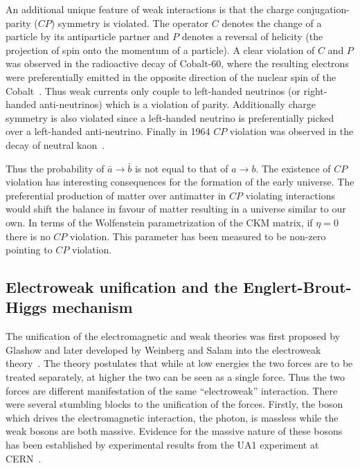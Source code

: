 An additional unique feature of weak interactions is that the charge conjugation-parity ($CP$) symmetry is violated. The operator $C$ denotes the change of a particle by its antiparticle partner and $P$ denotes a reversal of helicity (the projection of spin onto the momentum of a particle). A clear violation of $C$ and $P$ was observed in the radioactive decay of Cobalt-60, where the resulting electrons were preferentially emitted in the opposite direction of the nuclear spin of the Cobalt~\cite{Experimentalb}. Thus weak currents only couple to left-handed neutrinos (or right-handed anti-neutrinos) which is a violation of parity. Additionally charge symmetry is also violated since a left-handed neutrino is preferentially picked over a left-handed anti-neutrino. Finally in 1964 $CP$ violation was observed in the decay of neutral kaon~\cite{Evidence}.

Thus the probability of $\bar{a}\rightarrow \bar{b}$ is not equal to that of $a\rightarrow b$. The existence of $CP$ violation has interesting consequences for the formation of the early universe. The preferential production of matter over antimatter in $CP$ violating interactions would shift the balance in favour of matter resulting in a universe similar to our own. In terms of the Wolfenstein parametrization of the CKM matrix, if $\eta=0$ there is no $CP$ violation. This parameter has been measured to be non-zero pointing to $CP$ violation.

\subsection{Electroweak unification and the Englert-Brout-Higgs mechanism}

The unification of the electromagnetic and weak theories was first proposed by Glashow and later developed by Weinberg and Salam into the electroweak theory~\cite{Model,Theory:WeakInteractionsGlashow,Theory:WeakEMInteractions}. The theory postulates that while at low energies the two forces are to be treated separately, at higher the two can be seen as a single force. Thus the two forces are different manifestation of the same ``electroweak'' interaction. There were several stumbling blocks to the unification of the forces. Firstly, the boson which drives the electromagnetic interaction, the photon, is massless while the weak bosons are both massive. Evidence for the massive nature of these bosons has been established by experimental results from the UA1 experiment at CERN~\cite{Theory:WBosonObservationPaper}.

